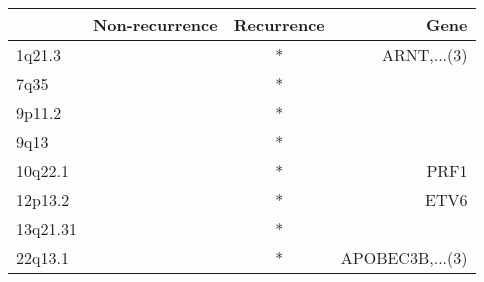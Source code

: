 \begin{tabular}{lccr}
\toprule
{} & Non-recurrence & Recurrence &             Gene \\
\midrule
1q21.3   &                &          * &      ARNT,...(3) \\
7q35     &                &          * &                  \\
9p11.2   &                &          * &                  \\
9q13     &                &          * &                  \\
10q22.1  &                &          * &             PRF1 \\
12p13.2  &                &          * &             ETV6 \\
13q21.31 &                &          * &                  \\
22q13.1  &                &          * &  APOBEC3B,...(3) \\
\bottomrule
\end{tabular}
